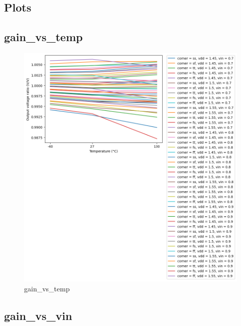 \documentclass[
  a4paper,
  DIV=11,
  numbers=noendperiod]{scrartcl}
\begin{document}
\begin{tcolorbox}
\subsection*{Plots}\label{plots}

\subsection*{gain\_vs\_temp}\label{gain_vs_temp}

\begin{figure}[H]

{\centering \includegraphics{./cace/_docs/ota-5t/schematic/gain_vs_temp.png}

}

\caption{gain\_vs\_temp}

\end{figure}%

\subsection*{gain\_vs\_vin}\label{gain_vs_vin}

\begin{figure}[H]


\end{figure}
\end{tcolorbox}
\end{document}
